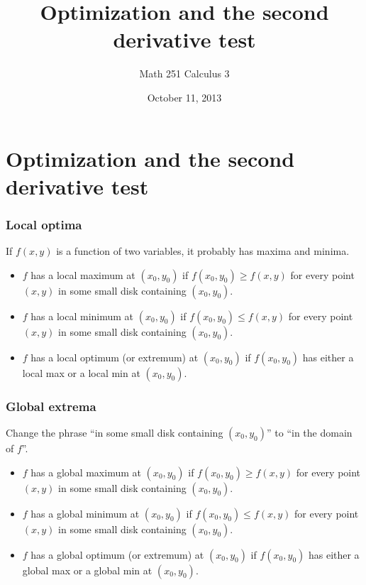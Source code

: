 \documentclass[11pt,ignorenonframetext,aspectratio=169,xcolor={svgnames}]{beamer}
\title{Optimization and the second derivative test}
\author{Math 251 Calculus 3}
\date{October 11, 2013}
\begin{document}
\frame{\titlepage}

\section{Optimization and the second derivative test}

\begin{frame}\frametitle{Local optima}

If $f(x,y)$ is a function of two variables, it probably has maxima and
minima.

\begin{itemize}
\item
  $f$ has a local maximum at $(x_0,y_0)$ if $f(x_0,y_0) \geq f(x,y)$ for
  every point $(x,y)$ in some small disk containing $(x_0,y_0)$.
\item
  $f$ has a local minimum at $(x_0,y_0)$ if $f(x_0,y_0) \leq f(x,y)$ for
  every point $(x,y)$ in some small disk containing $(x_0,y_0)$.
\item
  $f$ has a local optimum (or extremum) at $(x_0,y_0)$ if $f(x_0,y_0)$
  has either a local max or a local min at $(x_0, y_0)$.
\end{itemize}

\end{frame}

\begin{frame}\frametitle{Global extrema}

Change the phrase ``in some small disk containing $(x_0, y_0)$'' to ``in
the domain of $f$''.

\begin{itemize}

\item
  $f$ has a global maximum at $(x_0,y_0)$ if $f(x_0,y_0) \geq f(x,y)$
  for every point $(x,y)$ in some small disk containing $(x_0,y_0)$.
\item
  $f$ has a global minimum at $(x_0,y_0)$ if $f(x_0,y_0) \leq f(x,y)$
  for every point $(x,y)$ in some small disk containing $(x_0,y_0)$.
\item
  $f$ has a global optimum (or extremum) at $(x_0,y_0)$ if $f(x_0,y_0)$
  has either a global max or a global min at $(x_0, y_0)$.
\end{itemize}

\end{frame}
\end{document}

